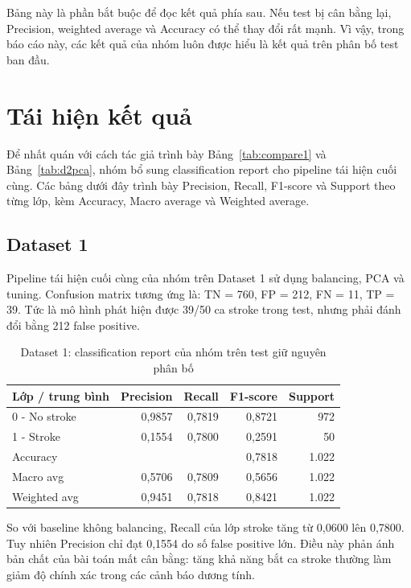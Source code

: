 Bảng này là phần bắt buộc để đọc kết quả phía sau. Nếu test bị cân bằng lại, Precision, weighted average và Accuracy có thể thay đổi rất mạnh. Vì vậy, trong báo cáo này, các kết quả của nhóm luôn được hiểu là kết quả trên phân bố test ban đầu.

\section{Tái hiện kết quả}

Để nhất quán với cách tác giả trình bày Bảng~\ref{tab:compare1} và Bảng~\ref{tab:d2pca}, nhóm bổ sung classification report cho pipeline tái hiện cuối cùng. Các bảng dưới đây trình bày Precision, Recall, F1-score và Support theo từng lớp, kèm Accuracy, Macro average và Weighted average.

\subsection{Dataset 1}

Pipeline tái hiện cuối cùng của nhóm trên Dataset 1 sử dụng balancing, PCA và tuning. Confusion matrix tương ứng là: TN = 760, FP = 212, FN = 11, TP = 39. Tức là mô hình phát hiện được 39/50 ca stroke trong test, nhưng phải đánh đổi bằng 212 false positive.

\begin{table}[H]
\centering
\small
\caption{Dataset 1: classification report của nhóm trên test giữ nguyên phân bố}
\label{tab:d1_classification_report}
\begin{tabular}{lrrrr}
\toprule
\textbf{Lớp / trung bình} & \textbf{Precision} & \textbf{Recall} & \textbf{F1-score} & \textbf{Support}\\
\midrule
0 - No stroke & 0,9857 & 0,7819 & 0,8721 & 972\\
1 - Stroke & 0,1554 & 0,7800 & 0,2591 & 50\\
\midrule
Accuracy &  &  & 0,7818 & 1.022\\
Macro avg & 0,5706 & 0,7809 & 0,5656 & 1.022\\
Weighted avg & 0,9451 & 0,7818 & 0,8421 & 1.022\\
\bottomrule
\end{tabular}
\end{table}

So với baseline không balancing, Recall của lớp stroke tăng từ 0,0600 lên 0,7800. Tuy nhiên Precision chỉ đạt 0,1554 do số false positive lớn. Điều này phản ánh bản chất của bài toán mất cân bằng: tăng khả năng bắt ca stroke thường làm giảm độ chính xác trong các cảnh báo dương tính.

